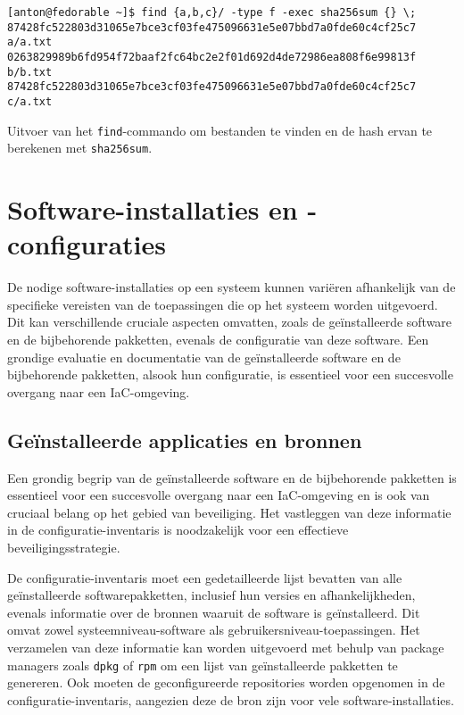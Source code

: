 \begin{listing}
  \begin{verbatim}
[anton@fedorable ~]$ find {a,b,c}/ -type f -exec sha256sum {} \;
87428fc522803d31065e7bce3cf03fe475096631e5e07bbd7a0fde60c4cf25c7  a/a.txt
0263829989b6fd954f72baaf2fc64bc2e2f01d692d4de72986ea808f6e99813f  b/b.txt
87428fc522803d31065e7bce3cf03fe475096631e5e07bbd7a0fde60c4cf25c7  c/a.txt
  \end{verbatim}
  \caption[Find-commando voor bestandshashes.]{Uitvoer van het \texttt{find}-commando om bestanden te vinden en de hash ervan te berekenen met \texttt{sha256sum}.}
  \label{lst:sha256sum}
\end{listing}

\section{Software-installaties en -configuraties}
\label{risico_software}

De nodige software-installaties op een systeem kunnen vari\"eren afhankelijk van de specifieke vereisten van de toepassingen die op het systeem worden uitgevoerd.
Dit kan verschillende cruciale aspecten omvatten, zoals de ge\"installeerde software en de bijbehorende pakketten, evenals de configuratie van deze software.
Een grondige evaluatie en documentatie van de ge\"installeerde software en de bijbehorende pakketten, alsook hun configuratie, is essentieel voor een succesvolle overgang naar een IaC-omgeving.

\subsection{Ge{\"i}nstalleerde applicaties en bronnen}
\label{risico_software_installaties_bronnen}

Een grondig begrip van de ge\"installeerde software en de bijbehorende pakketten is essentieel voor een succesvolle overgang naar een IaC-omgeving en is ook van cruciaal belang op het gebied van beveiliging.
Het vastleggen van deze informatie in de configuratie-inventaris is noodzakelijk voor een effectieve beveiligingsstrategie.

De configuratie-inventaris moet een gedetailleerde lijst bevatten van alle ge\"installeerde softwarepakketten, inclusief hun versies en afhankelijkheden, evenals informatie over de bronnen waaruit de software is ge\"installeerd.
Dit omvat zowel systeemniveau-software als gebruikersniveau-toepassingen.
Het verzamelen van deze informatie kan worden uitgevoerd met behulp van package managers zoals \texttt{dpkg} of \texttt{rpm} om een lijst van ge\"installeerde pakketten te genereren.
Ook moeten de geconfigureerde repositories worden opgenomen in de configuratie-inventaris, aangezien deze de bron zijn voor vele software-installaties.

